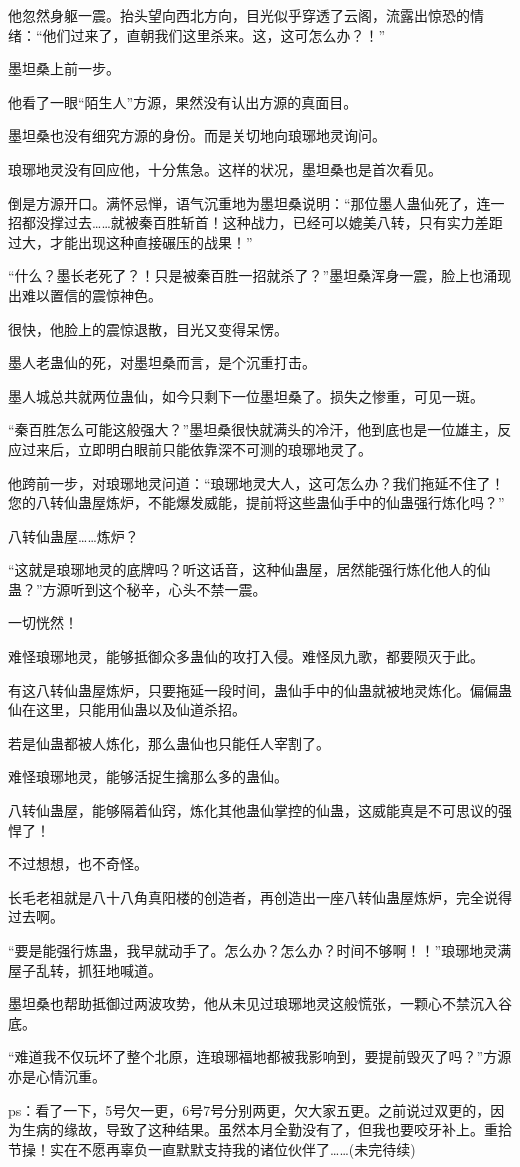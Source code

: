 \begin{this_body}
他忽然身躯一震。抬头望向西北方向，目光似乎穿透了云阁，流露出惊恐的情绪：“他们过来了，直朝我们这里杀来。这，这可怎么办？！”

墨坦桑上前一步。

他看了一眼“陌生人”方源，果然没有认出方源的真面目。

墨坦桑也没有细究方源的身份。而是关切地向琅琊地灵询问。

琅琊地灵没有回应他，十分焦急。这样的状况，墨坦桑也是首次看见。

倒是方源开口。满怀忌惮，语气沉重地为墨坦桑说明：“那位墨人蛊仙死了，连一招都没撑过去……就被秦百胜斩首！这种战力，已经可以媲美八转，只有实力差距过大，才能出现这种直接碾压的战果！”

“什么？墨长老死了？！只是被秦百胜一招就杀了？”墨坦桑浑身一震，脸上也涌现出难以置信的震惊神色。

很快，他脸上的震惊退散，目光又变得呆愣。

墨人老蛊仙的死，对墨坦桑而言，是个沉重打击。

墨人城总共就两位蛊仙，如今只剩下一位墨坦桑了。损失之惨重，可见一斑。

“秦百胜怎么可能这般强大？”墨坦桑很快就满头的冷汗，他到底也是一位雄主，反应过来后，立即明白眼前只能依靠深不可测的琅琊地灵了。

他跨前一步，对琅琊地灵问道：“琅琊地灵大人，这可怎么办？我们拖延不住了！您的八转仙蛊屋炼炉，不能爆发威能，提前将这些蛊仙手中的仙蛊强行炼化吗？”

八转仙蛊屋……炼炉？

“这就是琅琊地灵的底牌吗？听这话音，这种仙蛊屋，居然能强行炼化他人的仙蛊？”方源听到这个秘辛，心头不禁一震。

一切恍然！

难怪琅琊地灵，能够抵御众多蛊仙的攻打入侵。难怪凤九歌，都要陨灭于此。

有这八转仙蛊屋炼炉，只要拖延一段时间，蛊仙手中的仙蛊就被地灵炼化。偏偏蛊仙在这里，只能用仙蛊以及仙道杀招。

若是仙蛊都被人炼化，那么蛊仙也只能任人宰割了。

难怪琅琊地灵，能够活捉生擒那么多的蛊仙。

八转仙蛊屋，能够隔着仙窍，炼化其他蛊仙掌控的仙蛊，这威能真是不可思议的强悍了！

不过想想，也不奇怪。

长毛老祖就是八十八角真阳楼的创造者，再创造出一座八转仙蛊屋炼炉，完全说得过去啊。

“要是能强行炼蛊，我早就动手了。怎么办？怎么办？时间不够啊！！”琅琊地灵满屋子乱转，抓狂地喊道。

墨坦桑也帮助抵御过两波攻势，他从未见过琅琊地灵这般慌张，一颗心不禁沉入谷底。

“难道我不仅玩坏了整个北原，连琅琊福地都被我影响到，要提前毁灭了吗？”方源亦是心情沉重。

ps：看了一下，5号欠一更，6号7号分别两更，欠大家五更。之前说过双更的，因为生病的缘故，导致了这种结果。虽然本月全勤没有了，但我也要咬牙补上。重拾节操！实在不愿再辜负一直默默支持我的诸位伙伴了……(未完待续)

\end{this_body}

